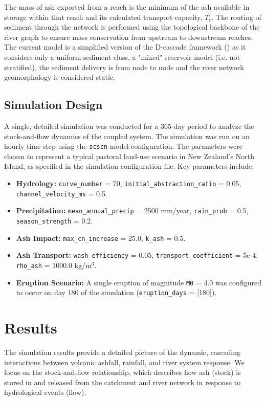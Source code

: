 \documentclass[12pt, a4paper]{article}
\begin{document}
The mass of ash exported from a reach is the minimum of the ash available in storage within that reach and its calculated transport capacity, $T_c$. The routing of sediment through the network is performed using the topological backbone of the river graph to ensure mass conservation from upstream to downstream reaches. The  current model is a simplified version of the D-cascade framework (\citealp{Tangi2022}) as it considers only a uniform sediment class, a "mixed" reservoir model (i.e. not stratified), the sediment delivery is from node to node and the river network geomorphology is considered static.

\subsection{Simulation Design}
A single, detailed simulation was conducted for a 365-day period to analyze the stock-and-flow dynamics of the coupled system. The simulation was run on an hourly time step using the \texttt{scscn} model configuration. The parameters were chosen to represent a typical pastoral land-use scenario in New Zealand's North Island, as specified in the simulation configuration file. Key parameters include:
\begin{itemize}
    \item \textbf{Hydrology:} \texttt{curve\_number} = 70, \texttt{initial\_abstraction\_ratio} = 0.05, \texttt{channel\_velocity\_ms} = 0.5.
    \item \textbf{Precipitation:} \texttt{mean\_annual\_precip} = 2500 mm/year, \texttt{rain\_prob} = 0.5, \texttt{season\_strength} = 0.2.
    \item \textbf{Ash Impact:} \texttt{max\_cn\_increase} = 25.0, \texttt{k\_ash} = 0.5.
    \item \textbf{Ash Transport:} \texttt{wash\_efficiency} = 0.05, \texttt{transport\_coefficient} = 5e-4, \texttt{rho\_ash} = 1000.0 kg/m$^3$.
    \item \textbf{Eruption Scenario:} A single eruption of magnitude \texttt{M0} = 4.0 was configured to occur on day 180 of the simulation (\texttt{eruption\_days} = [180]).
\end{itemize}

\section{Results}
The simulation results provide a detailed picture of the dynamic, cascading interactions between volcanic ashfall, rainfall, and river system response. We focus on the stock-and-flow relationship, which describes how ash (stock) is stored in and released from the catchment and river network in response to hydrological events (flow).
\end{document}
